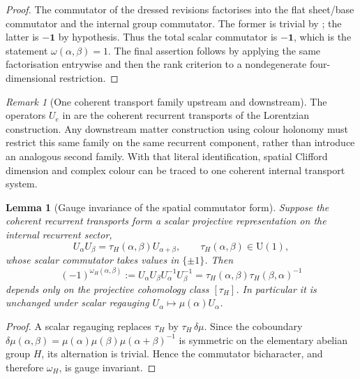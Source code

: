 \documentclass[11pt]{article}
\newtheorem{lemma}[theorem]{Lemma}
\theoremstyle{definition}
\theoremstyle{remark}
\newtheorem{remark}[theorem]{Remark}
\newcommand{\one}{\mathbf{1}}
\begin{document}
\begin{proof}
The commutator of the dressed revisions factorises into the flat sheet/base
commutator and the internal group commutator.  The former is trivial by
; the latter is $-\one$ by hypothesis.  Thus
the total scalar commutator is $-\one$, which is the statement
$\omega(\alpha,\beta)=1$.  The final assertion follows by applying the same
factorisation entrywise and then the rank criterion to a nondegenerate
four-dimensional restriction.
\end{proof}

\begin{remark}[One coherent transport family upstream and downstream]
\label{rem:shared-coherent-transport}
The operators $U_e$ in  are the coherent
recurrent transports of the Lorentzian construction.  Any downstream matter
construction using colour holonomy must restrict this same family on the same
recurrent component, rather than introduce an analogous second family.  With
that literal identification, spatial Clifford dimension and complex colour can
be traced to one coherent internal transport system.
\end{remark}

\begin{lemma}[Gauge invariance of the spatial commutator form]
\label{lem:spatial-omega-gauge-invariant}
Suppose the coherent recurrent transports form a scalar projective
representation on the internal recurrent sector,
\[
 U_\alpha U_\beta=\tau_H(\alpha,\beta)U_{\alpha+\beta},
 \qquad \tau_H(\alpha,\beta)\in\mathrm U(1),
\]
whose scalar commutator takes values in $\{\pm1\}$.  Then
\[
 (-1)^{\omega_H(\alpha,\beta)}
 :=U_\alpha U_\beta U_\alpha^{-1}U_\beta^{-1}
 =\tau_H(\alpha,\beta)\tau_H(\beta,\alpha)^{-1}
\]
depends only on the projective cohomology class $[\tau_H]$.  In particular it
is unchanged under scalar regauging $U_\alpha\mapsto\mu(\alpha)U_\alpha$.
\end{lemma}

\begin{proof}
A scalar regauging replaces $\tau_H$ by $\tau_H\,\delta\mu$.  Since the
coboundary $\delta\mu(\alpha,\beta)=\mu(\alpha)\mu(\beta)
\mu(\alpha+\beta)^{-1}$ is symmetric on the elementary abelian group $H$, its
alternation is trivial.  Hence the commutator bicharacter, and therefore
$\omega_H$, is gauge invariant.
\end{proof}
\end{document}
